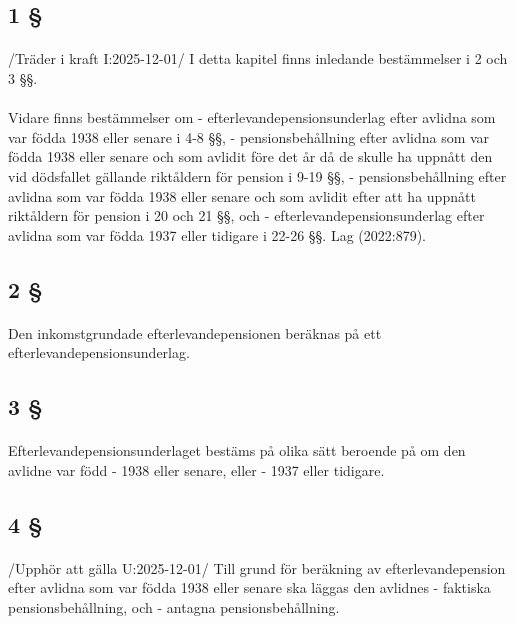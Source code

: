 \documentclass[a4paper,notitlepage,openany,10pt]{book}
\begin{document}
\subsection*{1 §}
\paragraph*{}
/Träder i kraft I:2025-12-01/
I detta kapitel finns inledande bestämmelser i 2 och 3 §§.
\paragraph*{}
Vidare finns bestämmelser om
\newline - efterlevandepensionsunderlag efter avlidna som var födda 1938 eller senare i 4-8 §§,
\newline - pensionsbehållning efter avlidna som var födda 1938 eller senare och som avlidit före det år då de skulle ha uppnått den vid dödsfallet gällande riktåldern för pension i 9-19 §§,
\newline - pensionsbehållning efter avlidna som var födda 1938 eller senare och som avlidit efter att ha uppnått riktåldern för pension i 20 och 21 §§, och
\newline - efterlevandepensionsunderlag efter avlidna som var födda 1937 eller tidigare i 22-26 §§.
Lag (2022:879).
\subsection*{2 §}
\paragraph*{}
Den inkomstgrundade efterlevandepensionen beräknas på ett efterlevandepensionsunderlag.
\subsection*{3 §}
\paragraph*{}
Efterlevandepensionsunderlaget bestäms på olika sätt beroende på om den avlidne var född
\newline - 1938 eller senare, eller
\newline - 1937 eller tidigare.
\subsection*{4 §}
\paragraph*{}
/Upphör att gälla U:2025-12-01/
Till grund för beräkning av efterlevandepension efter avlidna som var födda 1938 eller senare ska läggas den avlidnes
\newline - faktiska pensionsbehållning, och
\newline - antagna pensionsbehållning.
\end{document}
